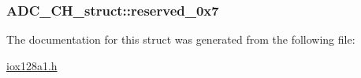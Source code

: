 \label{struct_a_d_c___c_h__struct_af653adc54953386f00d623f98610bf7c}
\hypertarget{struct_a_d_c___c_h__struct_aa60ced5f03cdba546bab8a497ae05ea8}{
\subsubsection[{reserved\_\-0x7}]{ {\bf ADC\_\-CH\_\-struct::reserved\_\-0x7}}}
\label{struct_a_d_c___c_h__struct_aa60ced5f03cdba546bab8a497ae05ea8}


The documentation for this struct was generated from the following file:\begin{DoxyCompactItemize}
\item 
\hyperlink{iox128a1_8h}{iox128a1.h}\end{DoxyCompactItemize}
